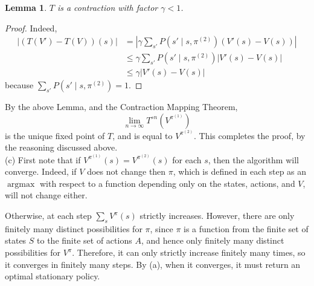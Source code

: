 \documentclass[12pt]{article}
\DeclareMathOperator{\argmax}{argmax}
\newtheorem{lemma}[thm]{Lemma}
\theoremstyle{remark}
\begin{document}
\begin{lemma}
$T$ is a contraction with factor $\gamma < 1$. 
\end{lemma}

\begin{proof}
Indeed, 
\begin{align*}
|(T(V')-T(V))(s)| & = |\gamma \sum_{s'} P(s' \mid s, \pi^{(2)}) (V'(s) - V(s))| \\
&\leq \gamma \sum_{s'} P(s' \mid s, \pi^{(2)}) |V'(s)-V(s)| \\
&\leq \gamma |V'(s)-V(s)|
\end{align*}
because $\sum_{s'} P(s' \mid s, \pi^{(2)}) = 1$. 
\end{proof}

By the above Lemma, and the Contraction Mapping Theorem, 
\[
\lim_{n \rightarrow \infty} T^{\circ n}(V^{\pi^{(1)}}) 
\]
is the unique fixed point of $T$, and is equal to $V^{\pi^{(2)}}$. This completes the proof, by the reasoning discussed above. \\ 

\noindent (c) First note that if $V^{\pi^{(1)}}(s) = V^{\pi^{(2)}}(s)$ for each $s$, then the algorithm will converge. Indeed, if $V$ does not change then $\pi$, which is defined in each step as an $\argmax$ with respect to a function depending only on the states, actions, and $V$, will not change either. 

Otherwise, at each step $\sum_s V^{\pi}(s)$ strictly increases. However, there are only finitely many distinct possibilities for $\pi$, since $\pi$ is a function from the finite set of states $S$ to the finite set of actions $A$, and hence only finitely many distinct possibilities for $V^{\pi}$. Therefore, it can only strictly increase finitely many times, so it converges in finitely many steps. By (a), when it converges, it must return an optimal stationary policy. 
\end{document}
